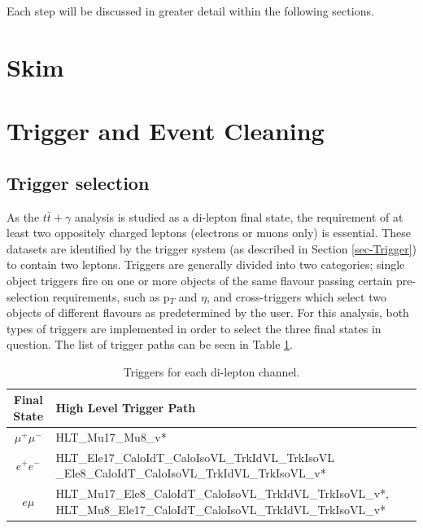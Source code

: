 Each step will be discussed in greater detail within the following sections. 

\section{Skim}

\section{Trigger and Event Cleaning} \label{sec-TriggerAndEventCleaning}

\subsection{Trigger selection}

As the $t\bar{t}+\gamma$ analysis is studied as a di-lepton final state, the requirement of at least two oppositely charged leptons (electrons or muons only) is essential. These datasets are identified by the trigger system (as described in Section \ref{sec-Trigger}) to contain two leptons. Triggers are generally divided into two categories; single object triggers fire on one or more objects of the same flavour passing certain pre-selection requirements, such as p$_T$ and $\eta$, and cross-triggers which select two objects of different flavours as predetermined by the user. For this analysis, both types of triggers are implemented in order to select the three final states in question. The list of trigger paths can be seen in Table \ref{tab-HLTriggers}. 

\begin{table} 
\begin{center}
\begin{tabular}{|c|p{11.5cm}|}
\hline
	\textbf{Final State} & \textbf{High Level Trigger Path} \\
\hline
	$\mu^+\mu^-$ & HLT\_Mu17\_Mu8\_v* \\
	$e^+e^-$ & HLT\_Ele17\_CaloIdT\_CaloIsoVL\_TrkIdVL\_TrkIsoVL
				\_Ele8\_CaloIdT\_CaloIsoVL\_TrkIdVL\_TrkIsoVL\_v* \\
	$e\mu$ & HLT\_Mu17\_Ele8\_CaloIdT\_CaloIsoVL\_TrkIdVL\_TrkIsoVL\_v*, HLT\_Mu8\_Ele17\_CaloIdT\_CaloIsoVL\_TrkIdVL\_TrkIsoVL\_v* \\
\hline	
\end{tabular}
\end{center}
\caption{Triggers for each di-lepton channel.}
\label{tab-HLTriggers}
\end{table}

